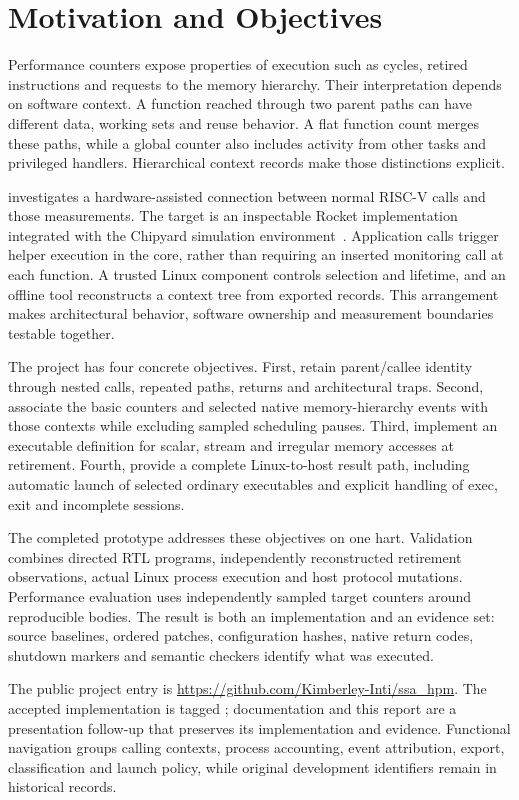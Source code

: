 \section{Motivation and Objectives}
Performance counters expose properties of execution such as cycles, retired instructions and requests to the memory hierarchy. Their interpretation depends on software context. A function reached through two parent paths can have different data, working sets and reuse behavior. A flat function count merges these paths, while a global counter also includes activity from other tasks and privileged handlers. Hierarchical context records make those distinctions explicit.

\project{} investigates a hardware-assisted connection between normal RISC-V calls and those measurements. The target is an inspectable Rocket implementation integrated with the Chipyard simulation environment~\citep{rocket,chipyard}. Application calls trigger helper execution in the core, rather than requiring an inserted monitoring call at each function. A trusted Linux component controls selection and lifetime, and an offline tool reconstructs a context tree from exported records. This arrangement makes architectural behavior, software ownership and measurement boundaries testable together.

The project has four concrete objectives. First, retain parent/callee identity through nested calls, repeated paths, returns and architectural traps. Second, associate the basic counters and selected native memory-hierarchy events with those contexts while excluding sampled scheduling pauses. Third, implement an executable definition for scalar, stream and irregular memory accesses at retirement. Fourth, provide a complete Linux-to-host result path, including automatic launch of selected ordinary executables and explicit handling of exec, exit and incomplete sessions.

The completed prototype addresses these objectives on one hart. Validation combines directed RTL programs, independently reconstructed retirement observations, actual Linux process execution and host protocol mutations. Performance evaluation uses independently sampled target counters around reproducible bodies. The result is both an implementation and an evidence set: source baselines, ordered patches, configuration hashes, native return codes, shutdown markers and semantic checkers identify what was executed.

The public project entry is \url{https://github.com/Kimberley-Inti/ssa_hpm}. The accepted implementation is tagged ; documentation and this report are a presentation follow-up that preserves its implementation and evidence. Functional navigation groups calling contexts, process accounting, event attribution, export, classification and launch policy, while original development identifiers remain in historical records.

